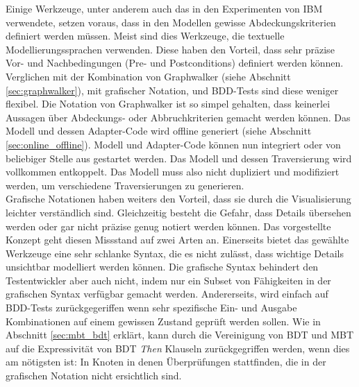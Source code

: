 Einige Werkzeuge, unter anderem auch das in den Experimenten von IBM \cite{farchi_using_2002} verwendete, setzen voraus, dass in den Modellen gewisse Abdeckungskriterien definiert werden müssen. Meist sind dies Werkzeuge, die textuelle Modellierungssprachen verwenden. Diese haben den Vorteil, dass sehr präzise Vor- und Nachbedingungen (Pre- und Postconditions) definiert werden können. Verglichen mit der Kombination von Graphwalker (siehe Abschnitt \ref{sec:graphwalker}), mit grafischer Notation, und BDD-Tests sind diese weniger flexibel. Die Notation von Graphwalker ist so simpel gehalten, dass keinerlei Aussagen über Abdeckungs- oder Abbruchkriterien gemacht werden können. Das Modell und dessen Adapter-Code wird offline generiert (siehe Abschnitt  \ref{sec:online_offline}). Modell und Adapter-Code können nun integriert oder von beliebiger Stelle aus gestartet werden. Das Modell und dessen Traversierung wird vollkommen entkoppelt. Das Modell muss also nicht dupliziert und modifiziert werden, um verschiedene Traversierungen zu generieren.\\
Grafische Notationen haben weiters den Vorteil, dass sie durch die Visualisierung leichter verständlich sind. Gleichzeitig besteht die Gefahr, dass Details übersehen werden oder gar nicht präzise genug notiert werden können. Das vorgestellte Konzept geht diesen Missstand auf zwei Arten an. Einerseits bietet das gewählte Werkzeuge eine sehr schlanke Syntax, die es nicht zulässt, dass wichtige Details unsichtbar modelliert werden können. Die grafische Syntax behindert den Testentwickler aber auch nicht, indem nur ein Subset von Fähigkeiten in der grafischen Syntax verfügbar gemacht werden. Andererseits, wird einfach auf BDD-Tests zurückgegeriffen wenn sehr spezifische Ein- und Ausgabe Kombinationen auf einem gewissen Zustand geprüft werden sollen. Wie in Abschnitt \ref{sec:mbt_bdt} erklärt, kann durch die Vereinigung von \Gls{BDT} und \Gls{MBT} auf die Expressivität von \Gls{BDT} \textit{Then} Klauseln zurückgegriffen werden, wenn dies am nötigsten ist: In Knoten in denen Überprüfungen stattfinden, die in der grafischen Notation nicht ersichtlich sind.\\
